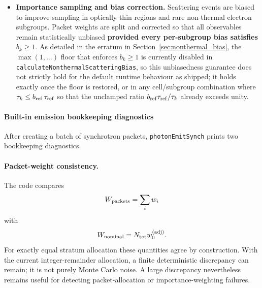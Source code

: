 \documentclass[12pt,a4paper]{article}
\newcommand{\code}[1]{\texttt{#1}}
\begin{document}
\begin{itemize}
	\item \textbf{Importance sampling and bias correction.}
	Scattering events are biased to improve sampling in optically thin
	regions and rare non-thermal electron subgroups. Packet weights are
	split and corrected so that all observables remain statistically
	unbiased \textbf{provided every per-subgroup bias satisfies
		$b_k\ge1$}. As detailed in the erratum in
	Section~\ref{sec:nonthermal_bias}, the $\max(1,\ldots)$ floor that
	enforces $b_k\ge1$ is currently disabled in
	\code{calculateNonthermalScatteringBias}, so this unbiasedness
	guarantee does not strictly hold for the default runtime behaviour
	as shipped; it holds exactly once the floor is restored, or in any
	cell/subgroup combination where $\tau_k \le b_{\rm ref}\,\tau_{\rm ref}$
	so that the unclamped ratio $b_{\rm ref}\tau_{\rm ref}/\tau_k$
	already exceeds unity.
\end{itemize}

\paragraph{Built-in emission bookkeeping diagnostics}
\label{sec:selfvalidation}

After creating a batch of synchrotron packets,
\code{photonEmitSynch} prints two bookkeeping diagnostics.

\paragraph{Packet-weight consistency.}
The code compares
\begin{equation}
	W_{\rm packets}
	=
	\sum_i w_i
\end{equation}
with
\begin{equation}
	W_{\rm nominal}
	=
	N_{\rm tot}w_0^{(\mathrm{adj})}.
\end{equation}
For exactly equal stratum allocation these quantities agree by
construction. With the current integer-remainder allocation, a finite
deterministic discrepancy can remain; it is not purely Monte Carlo
noise. A large discrepancy nevertheless remains useful for detecting
packet-allocation or importance-weighting failures.
\end{document}
